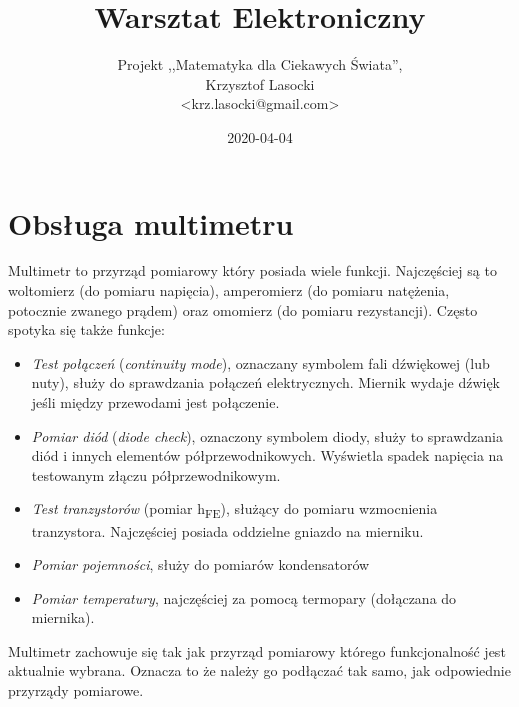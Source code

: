 \documentclass{pdfBooklets}
\title{Warsztat Elektroniczny}
\author{%
	Projekt ,,Matematyka dla Ciekawych Świata'',\\
	Krzysztof Lasocki\\\normalsize\ttfamily <krz.lasocki@gmail.com>
}
\date  {2020-04-04}
\begin{document}
\maketitle



\section{Obsługa multimetru}

Multimetr to przyrząd pomiarowy który posiada wiele funkcji. Najczęściej są to woltomierz (do pomiaru napięcia), amperomierz
(do pomiaru natężenia, potocznie zwanego prądem) oraz omomierz (do pomiaru rezystancji). Często spotyka się także funkcje:
\begin{itemize}
\item \emph{Test połączeń} (\textit{continuity mode}), oznaczany symbolem fali dźwiękowej (lub nuty), służy do sprawdzania połączeń elektrycznych.
  Miernik wydaje dźwięk jeśli między przewodami jest połączenie.
\item \emph{Pomiar diód} (\textit{diode check}), oznaczony symbolem diody, służy to sprawdzania diód i innych elementów półprzewodnikowych.
  Wyświetla spadek napięcia na testowanym złączu półprzewodnikowym.
\item \emph{Test tranzystorów} (pomiar h\textsubscript{FE}), służący do pomiaru wzmocnienia tranzystora. Najczęściej posiada oddzielne gniazdo
  na mierniku.
\item \emph{Pomiar pojemności}, służy do pomiarów kondensatorów
\item \emph{Pomiar temperatury}, najczęściej za pomocą termopary (dołączana do miernika).
\end{itemize}

Multimetr zachowuje się tak jak przyrząd pomiarowy którego funkcjonalność jest aktualnie wybrana. Oznacza to że należy go podłączać
tak samo, jak odpowiednie przyrządy pomiarowe. 
\end{document}
